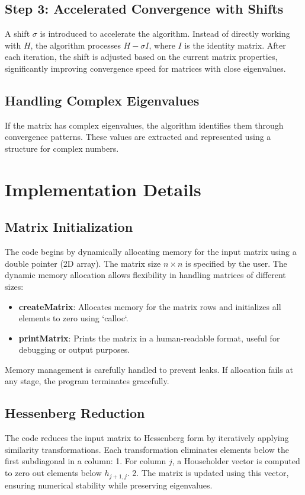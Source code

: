 \documentclass{article}
\begin{document}
\subsection{ Step 3: Accelerated Convergence with Shifts}
A shift \( \sigma \) is introduced to accelerate the algorithm. Instead of directly working with \( H \), the algorithm processes \( H - \sigma I \), where \( I \) is the identity matrix. After each iteration, the shift is adjusted based on the current matrix properties, significantly improving convergence speed for matrices with close eigenvalues.

\subsection{ Handling Complex Eigenvalues}
If the matrix has complex eigenvalues, the algorithm identifies them through convergence patterns. These values are extracted and represented using a structure for complex numbers.

\section{ Implementation Details}

\subsection{ Matrix Initialization}
The code begins by dynamically allocating memory for the input matrix using a double pointer (2D array). The matrix size \( n \times n \) is specified by the user. The dynamic memory allocation allows flexibility in handling matrices of different sizes:

\begin{itemize}
\item  \textbf{createMatrix}: Allocates memory for the matrix rows and initializes all elements to zero using `calloc`.
\item  \textbf{printMatrix}: Prints the matrix in a human-readable format, useful for debugging or output purposes.
\end{itemize}

Memory management is carefully handled to prevent leaks. If allocation fails at any stage, the program terminates gracefully.

\subsection{ Hessenberg Reduction}
The code reduces the input matrix to Hessenberg form by iteratively applying similarity transformations. Each transformation eliminates elements below the first subdiagonal in a column:
1. For column \( j \), a Householder vector is computed to zero out elements below \( h_{j+1,j} \).
2. The matrix is updated using this vector, ensuring numerical stability while preserving eigenvalues.
\end{document}
